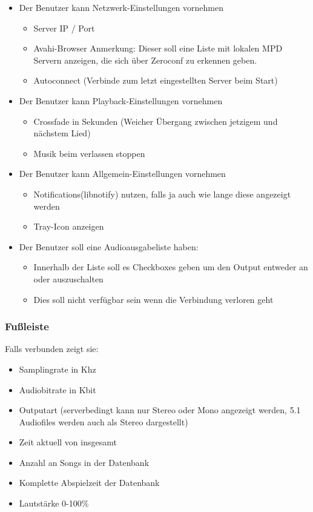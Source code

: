 \begin{itemize}
	\item Der Benutzer kann Netzwerk-Einstellungen vornehmen
	\begin{itemize}
		\item Server IP / Port
		\item Avahi-Browser
		      Anmerkung: Dieser soll eine Liste mit lokalen MPD Servern anzeigen,
		      die sich über Zeroconf zu erkennen geben. 
		\item Autoconnect (Verbinde zum letzt eingestellten Server beim Start)
	\end{itemize}
	\item Der Benutzer kann Playback-Einstellungen vornehmen	
	\begin{itemize}
		\item Crossfade in Sekunden (Weicher Übergang zwischen jetzigem und nächstem Lied)
		\item Musik beim verlassen stoppen
	\end{itemize}
	\item Der Benutzer kann Allgemein-Einstellungen vornehmen
	\begin{itemize}
		\item Notifications(libnotify) nutzen, falls ja auch wie lange diese angezeigt werden
		\item Tray-Icon anzeigen
	\end{itemize}
	\item Der Benutzer soll eine Audioausgabeliste haben:
	\begin{itemize}
		\item Innerhalb der Liste soll es Checkboxes geben um den Output entweder an oder auszuschalten
		\item Dies soll nicht verfügbar sein wenn die Verbindung verloren geht
	\end{itemize}
\end{itemize}

\subsubsection{Fußleiste}
Falls verbunden zeigt sie:
\begin{itemize}
	\item Samplingrate in Khz
	\item Audiobitrate in Kbit
	\item Outputart (serverbedingt kann nur Stereo oder Mono angezeigt werden, 5.1 Audiofiles werden auch als Stereo dargestellt)
	\item Zeit aktuell von insgesamt
	\item Anzahl an Songs in der Datenbank
	\item Komplette Abspielzeit der Datenbank
	\item Lautstärke 0-100\%
\end{itemize}
